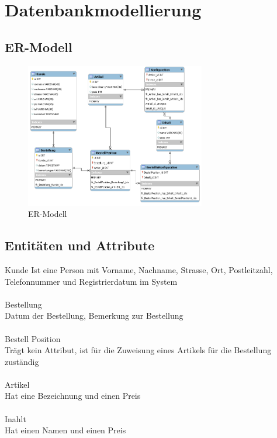 \documentclass{article}
\begin{document}
\section{Datenbankmodellierung}
\subsection{ER-Modell}
\begin{figure}[h]
\begin{center}
\includegraphics[width=0.7\textwidth]{res/erd.png}
\caption{ER-Modell}
\label{er-modell}
\end{center}
\end{figure}
\subsection{Entitäten und Attribute}
{\large Kunde}
Ist eine Person mit Vorname, Nachname, Strasse, Ort, Postleitzahl, Telefonnummer und Registrierdatum im System\\
\\
{\large Bestellung}\\
Datum der Bestellung, Bemerkung zur Bestellung\\
\\
{\large Bestell Position}\\
Trägt kein Attribut, ist für die Zuweisung eines Artikels für die Bestellung zuständig\\
\\
{\large Artikel}\\
Hat eine Bezeichnung und einen Preis\\
\\
{\large Inahlt}\\
Hat einen Namen und einen Preis 
\end{document}
